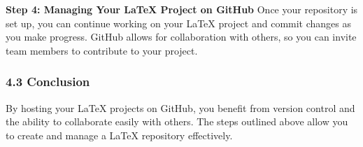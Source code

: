 \documentclass[a4paper,12pt]{article}
\begin{document}
\textbf{Step 4: Managing Your LaTeX Project on GitHub}
Once your repository is set up, you can continue working on your LaTeX project and commit changes as you make progress. GitHub allows for collaboration with others, so you can invite team members to contribute to your project.

\subsubsection*{4.3 Conclusion}
By hosting your LaTeX projects on GitHub, you benefit from version control and the ability to collaborate easily with others. The steps outlined above allow you to create and manage a LaTeX repository effectively.

\newpage
\end{document}
